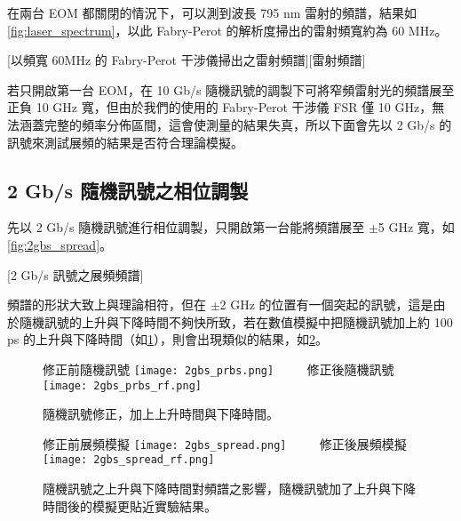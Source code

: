 \documentclass[class=NCU_thesis, crop=false]{standalone}
\begin{document}
在兩台 EOM 都關閉的情況下，可以測到波長 795 nm 雷射的頻譜，結果如\cref{fig:laser_spectrum}，以此 Fabry-Perot 的解析度掃出的雷射頻寬約為 60 MHz。

[以頻寬 60MHz 的 Fabry-Perot 干涉儀掃出之雷射頻譜][雷射頻譜]


若只開啟第一台 EOM，在 10 Gb/s 隨機訊號的調製下可將窄頻雷射光的頻譜展至正負 10 GHz 寬，但由於我們的使用的 Fabry-Perot 干涉儀 FSR 僅 10 GHz，無法涵蓋完整的頻率分佈區間，這會使測量的結果失真，所以下面會先以 2 Gb/s 的訊號來測試展頻的結果是否符合理論模擬。

\subsection{2 Gb/s 隨機訊號之相位調製}
先以 2 Gb/s 隨機訊號進行相位調製，只開啟第一台能將頻譜展至 $\pm$5 GHz 寬，如\cref{fig:2gbs_spread}。

[2 Gb/s 訊號之展頻頻譜]

頻譜的形狀大致上與理論相符，但在 $\pm$2 GHz 的位置有一個突起的訊號，這是由於隨機訊號的上升與下降時間不夠快所致，若在數值模擬中把隨機訊號加上約 100 ps 的上升與下降時間（如\cref{fig:simulation_rising_falling_prbs}），則會出現類似的結果，如\cref{fig:simulation_rising_falling}。

\begin{figure}[!hbt]
    \centering
    \subcaptionbox
        {修正前隨機訊號
        \label{fig:subfig_fig1}}
        {\texttt{[image: 2gbs\_prbs.png]}}
    ~~~~
    \subcaptionbox
        {修正後隨機訊號
        \label{fig:subfig_fig2}}
        {\texttt{[image: 2gbs\_prbs\_rf.png]}}
    \caption{隨機訊號修正，加上上升時間與下降時間。}
    \label{fig:simulation_rising_falling_prbs}
\end{figure}

\begin{figure}[!hbt]
    \centering
    \subcaptionbox
        {修正前展頻模擬
        \label{fig:subfig_fig1}}
        {\texttt{[image: 2gbs\_spread.png]}}
    ~~~~
    \subcaptionbox
        {修正後展頻模擬
        \label{fig:subfig_fig2}}
        {\texttt{[image: 2gbs\_spread\_rf.png]}}
    \caption[隨機訊號之上升與下降時間對頻譜之影響]{隨機訊號之上升與下降時間對頻譜之影響，隨機訊號加了上升與下降時間後的模擬更貼近實驗結果。}
    \label{fig:simulation_rising_falling}
\end{figure}
\end{document}
